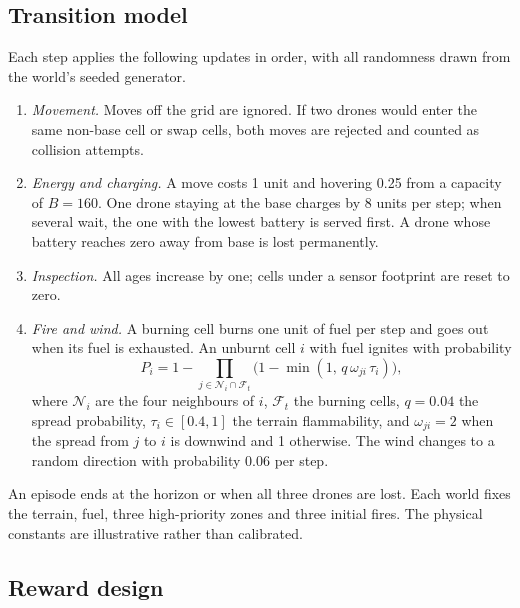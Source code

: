 \subsection{Transition model}

Each step applies the following updates in order, with all randomness drawn from the world's
seeded generator.
\begin{enumerate}
\item \emph{Movement.} Moves off the grid are ignored. If two drones would enter the same
non-base cell or swap cells, both moves are rejected and counted as collision attempts.
\item \emph{Energy and charging.} A move costs 1 unit and hovering 0.25 from a capacity of
$B = 160$. One drone staying at the base charges by 8 units per step; when several wait, the
one with the lowest battery is served first. A drone whose battery reaches zero away from
base is lost permanently.
\item \emph{Inspection.} All ages increase by one; cells under a sensor footprint are reset
to zero.
\item \emph{Fire and wind.} A burning cell burns one unit of fuel per step and goes out when
its fuel is exhausted. An unburnt cell $i$ with fuel ignites with probability
\begin{equation}
P_i = 1 - \prod_{j \in \mathcal{N}_i \cap \mathcal{F}_t}
\bigl(1 - \min(1,\, q\, \omega_{ji}\, \tau_i)\bigr),
\label{eq:spread}
\end{equation}
where $\mathcal{N}_i$ are the four neighbours of $i$, $\mathcal{F}_t$ the burning cells,
$q = 0.04$ the spread probability, $\tau_i \in [0.4, 1]$ the terrain flammability, and
$\omega_{ji} = 2$ when the spread from $j$ to $i$ is downwind and 1 otherwise. The wind
changes to a random direction with probability 0.06 per step.
\end{enumerate}
An episode ends at the horizon or when all three drones are lost. Each world fixes the
terrain, fuel, three high-priority zones and three initial fires. The physical constants are
illustrative rather than calibrated.

\subsection{Reward design}

